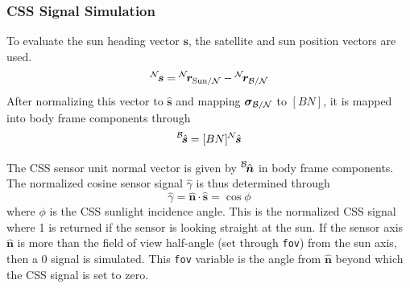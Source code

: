 \subsubsection{CSS Signal Simulation}
To evaluate the sun heading vector $\bm s$, the satellite and sun position vectors are used.
\begin{equation}
	\leftexp{N}{\bm s} = \leftexp{N}{\bm r}_{\mathrm{Sun}/\mathcal{N}} - \leftexp{N}{\bm r}_{\cal B/N}
\end{equation}
After normalizing this vector to $\hat{\bm s}$ and mapping $\bm\sigma_{\cal B/N}$ to $[BN]$, it is mapped into body frame components through
\begin{equation}
	\leftexp{B}{\hat{\bm s}} = [BN] \leftexp{N}{\hat{\bm s}}
\end{equation}

The CSS sensor unit normal vector is given by $\leftexp{B}{\hat{\bm n}}$ in body frame components.  The normalized cosine sensor signal $\hat\gamma$ is thus determined through
\begin{equation}
	\hat \gamma = \hat{\bm n} \cdot \hat{\bm s} = \cos\phi
\end{equation}
where $\phi$ is the CSS sunlight incidence angle.  
This is the normalized CSS signal where 1 is returned if the sensor is looking straight at the sun.  If the sensor axis $\hat{\bm n}$ is more than the field of view half-angle (set through {\tt fov}) from the sun axis, then a 0 signal is simulated.  This {\tt fov} variable is the angle from $\hat{\bm n}$ beyond which the CSS signal is set to zero.  

